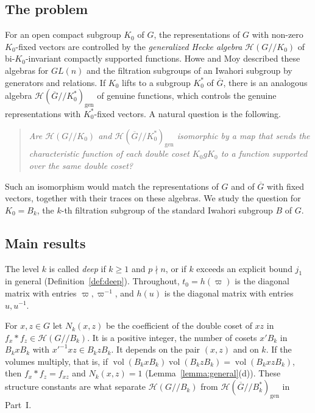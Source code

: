 \documentclass[12pt,letterpaper]{amsart}
\numberwithin{equation}{section}
\theoremstyle{definition}
\theoremstyle{remark}
\DeclareMathOperator{\vol}{vol}
\newcommand{\cH}{\mathcal{H}}
\newcommand{\Gbar}{\overline{G}}
\newcommand{\gen}{\mathrm{gen}}
\newcommand{\Hgen}{\cH(\Gbar/\!/B_k^*)_{\gen}}
\newcommand{\Hlin}{\cH(G/\!/B_k)}
\begin{document}
\subsection{The problem}
For an open compact subgroup $K_0$ of $G$, the representations of $G$
with non-zero $K_0$-fixed vectors are controlled by the
\emph{generalized Hecke algebra} $\cH(G/\!/K_0)$ of bi-$K_0$-invariant
compactly supported functions. Howe and Moy \cite{HM85} described these
algebras for $GL(n)$ and the filtration subgroups of an Iwahori
subgroup by generators and relations. If $K_0$ lifts to a subgroup
$K_0^*$ of $\Gbar$, there is an analogous algebra
$\cH(\Gbar/\!/K_0^*)_{\gen}$ of genuine functions, which controls the
genuine representations with $K_0^*$-fixed vectors. A natural question
is the following.

\begin{quote}
\emph{Are $\cH(G/\!/K_0)$ and $\cH(\Gbar/\!/K_0^*)_{\gen}$ isomorphic
by a map that sends the characteristic function of each double coset
$K_0gK_0$ to a function supported over the same double coset?}
\end{quote}

\noindent
Such an isomorphism would match the representations of $G$ and of
$\Gbar$ with fixed vectors, together with their traces on these
algebras. We study the question for $K_0=B_k$, the $k$-th filtration
subgroup of the standard Iwahori subgroup $B$ of $G$.

\subsection{Main results}
The level $k$ is called \emph{deep} if $k\geq 1$ and $p\nmid n$, or if
$k$ exceeds an explicit bound $j_1$ in general
(Definition~\ref{def:deep}). Throughout, $t_0=h(\varpi)$ is the
diagonal matrix with entries $\varpi,\varpi^{-1}$, and $h(u)$ is the
diagonal matrix with entries $u,u^{-1}$.

For $x,z\in G$ let $N_k(x,z)$ be the coefficient of the double coset of
$xz$ in $f_x*f_z\in\Hlin$. It is a positive integer, the number of
cosets $x'B_k$ in $B_kxB_k$ with $x'^{-1}xz\in B_kzB_k$. It depends on
the pair $(x,z)$ and on $k$. If the volumes multiply, that is, if
$\vol(B_kxB_k)\vol(B_kzB_k)=\vol(B_kxzB_k)$, then $f_x*f_z=f_{xz}$ and
$N_k(x,z)=1$ (Lemma~\ref{lemma:general}(d)). These structure constants
are what separate $\Hlin$ from $\Hgen$ in Part~I.
\end{document}
